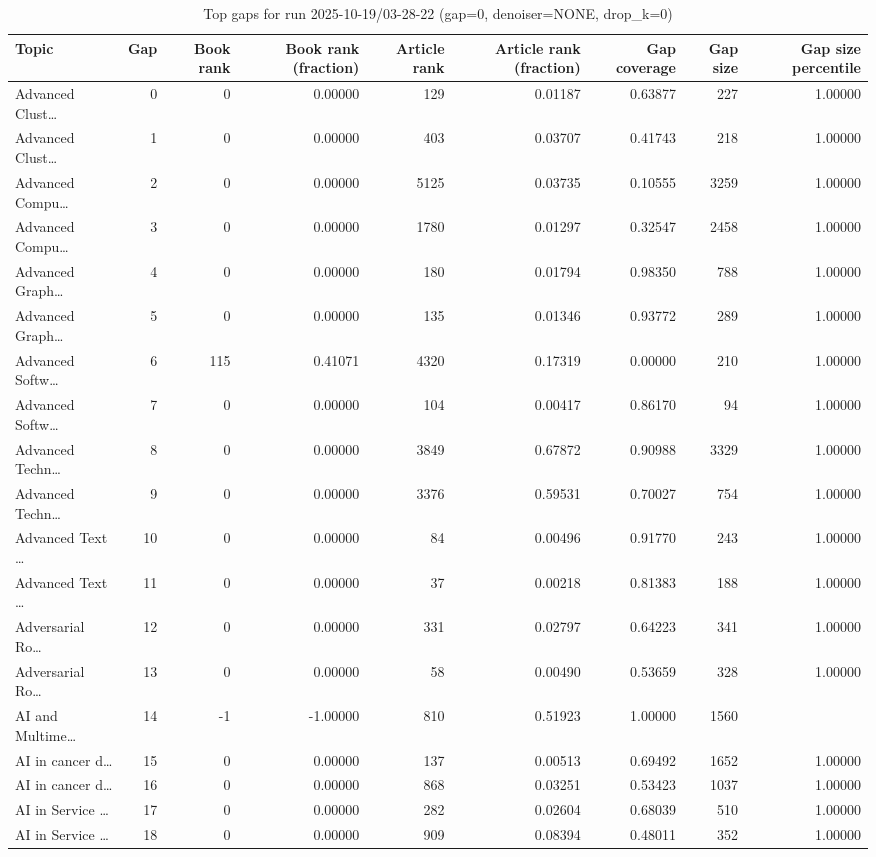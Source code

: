 \begin{table}
\caption{Top gaps for run 2025-10-19/03-28-22 (gap=0, denoiser=NONE, drop\_k=0)}
\label{tab:best_run_gap0_2025_10_19_03_28_22}
\begin{tabular}{lrrrrrrrr}
\toprule
Topic & Gap & Book rank & Book rank (fraction) & Article rank & Article rank (fraction) & Gap coverage & Gap size & Gap size percentile \\
\midrule
Advanced Clust… & 0 & 0 & 0.00000 & 129 & 0.01187 & 0.63877 & 227 & 1.00000 \\
Advanced Clust… & 1 & 0 & 0.00000 & 403 & 0.03707 & 0.41743 & 218 & 1.00000 \\
Advanced Compu… & 2 & 0 & 0.00000 & 5125 & 0.03735 & 0.10555 & 3259 & 1.00000 \\
Advanced Compu… & 3 & 0 & 0.00000 & 1780 & 0.01297 & 0.32547 & 2458 & 1.00000 \\
Advanced Graph… & 4 & 0 & 0.00000 & 180 & 0.01794 & 0.98350 & 788 & 1.00000 \\
Advanced Graph… & 5 & 0 & 0.00000 & 135 & 0.01346 & 0.93772 & 289 & 1.00000 \\
Advanced Softw… & 6 & 115 & 0.41071 & 4320 & 0.17319 & 0.00000 & 210 & 1.00000 \\
Advanced Softw… & 7 & 0 & 0.00000 & 104 & 0.00417 & 0.86170 & 94 & 1.00000 \\
Advanced Techn… & 8 & 0 & 0.00000 & 3849 & 0.67872 & 0.90988 & 3329 & 1.00000 \\
Advanced Techn… & 9 & 0 & 0.00000 & 3376 & 0.59531 & 0.70027 & 754 & 1.00000 \\
Advanced Text … & 10 & 0 & 0.00000 & 84 & 0.00496 & 0.91770 & 243 & 1.00000 \\
Advanced Text … & 11 & 0 & 0.00000 & 37 & 0.00218 & 0.81383 & 188 & 1.00000 \\
Adversarial Ro… & 12 & 0 & 0.00000 & 331 & 0.02797 & 0.64223 & 341 & 1.00000 \\
Adversarial Ro… & 13 & 0 & 0.00000 & 58 & 0.00490 & 0.53659 & 328 & 1.00000 \\
AI and Multime… & 14 & -1 & -1.00000 & 810 & 0.51923 & 1.00000 & 1560 &  \\
AI in cancer d… & 15 & 0 & 0.00000 & 137 & 0.00513 & 0.69492 & 1652 & 1.00000 \\
AI in cancer d… & 16 & 0 & 0.00000 & 868 & 0.03251 & 0.53423 & 1037 & 1.00000 \\
AI in Service … & 17 & 0 & 0.00000 & 282 & 0.02604 & 0.68039 & 510 & 1.00000 \\
AI in Service … & 18 & 0 & 0.00000 & 909 & 0.08394 & 0.48011 & 352 & 1.00000 \\

\end{tabular}
\end{table}
